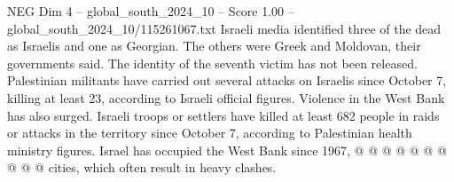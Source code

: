 \begin{textsample}{NEG Dim 4 – global\_south\_2024\_10 – Score 1.00 – global\_south\_2024\_10/115261067.txt}
Israeli media identified three of the dead as Israelis and one as Georgian.
The others were Greek and Moldovan, their governments said.
The identity of the seventh victim has not been released.
Palestinian militants have carried out several attacks on Israelis since October 7, killing at least 23, according to Israeli official figures.
Violence in the West Bank has also surged.
Israeli troops or settlers have killed at least 682 people in raids or attacks in the territory since October 7, according to Palestinian health ministry figures.
Israel has occupied the West Bank since 1967, @ @ @ @ @ @ @ @ @ @ cities, which often result in heavy clashes.

\end{textsample}

